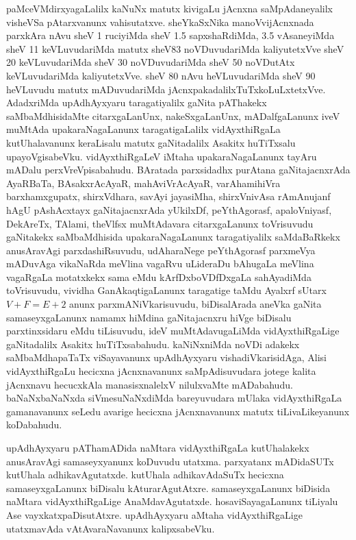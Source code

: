 paMceVMdirxyagaLalilx kaNuNx matutx kivigaLu jAcnxna saMpAdaneyalilx visheVSa pAtarxvanunx vahisutatxve. sheYkaSxNika manoVvijAcnxnada parxkAra nAvu sheV {\rm 1} ruciyiMda sheV 
{\rm 1.5} sapxshaRdiMda, {\rm 3.5} vAsaneyiMda sheV {\rm 11} keVLuvudariMda matutx sheV{\rm 83} noVDuvudariMda kaliyutetxVve sheV {\rm 20} keVLuvudariMda sheV {\rm 30} noVDuvudariMda sheV {\rm 50} noVDutAtx keVLuvudariMda kaliyutetxVve. sheV {\rm 80} nAvu heVLuvudariMda sheV {\rm 90} heVLuvudu matutx mADuvudariMda jAcnxpakadalilxTuTxkoLuLxtetxVve. AdadxriMda upAdhAyxyaru taragatiyalilx gaNita pAThakekx saMbaMdhisidaMte citarxgaLanUnx, nakeSxgaLanUnx, mADalfgaLanunx iveV muMtAda upakaraNagaLanunx taragatigaLalilx vidAyxthiRgaLa kutUhalavanunx keraLisalu matutx gaNitadalilx Asakitx huTiTxsalu upayoVgisabeVku. vidAyxthiRgaLeV iMtaha upakaraNagaLanunx tayAru mADalu perxVreVpisabahudu. BAratada parxsidadhx purAtana gaNitajacnxrAda AyaRBaTa, BAsakxrAcAyaR, mahAviVrAcAyaR, varAhamihiVra barxhamxgupatx, shirxVdhara, savAyi jayasiMha, shirxVnivAsa rAmAnujanf hAgU pAshAcxtayx gaNitajacnxrAda yUkilxDf, peYthAgorasf, apaloVniyasf, DekAreTx, TAlami, theVlfsx muMtAdavara citarxgaLanunx toVrisuvudu gaNitakekx saMbaMdhisida upakaraNagaLanunx taragatiyalilx saMdaBaRkekx anusAravAgi parxdashiRsuvudu, udAharaNege peYthAgorasf parxmeVya mADuvAga vikaNaRda meVlina vagaRvu uLideraDu bAhugaLa meVlina vagaRgaLa motatxkekx sama eMdu kArfDxboVDfDxgaLa sahAyadiMda toVrisuvudu, vividha GanAkaqtigaLanunx taragatige taMdu Ayalxrf sUtarx $V+F=E+2$ anunx parxmANiVkarisuvudu, biDisalArada aneVka gaNita samaseyxgaLanunx namamx hiMdina gaNitajacnxru hiVge biDisalu parxtinxsidaru eMdu tiLisuvudu, ideV muMtAdavugaLiMda vidAyxthiRgaLige
gaNitadalilx Asakitx huTiTxsabahudu. kaNiNxniMda noVDi adakekx saMbaMdhapaTaTx viSayavanunx upAdhAyxyaru vishadiVkarisidAga, Alisi vidAyxthiRgaLu hecicxna jAcnxnavanunx saMpAdisuvudara jotege kalita jAcnxnavu hecucxkAla manasisxnalelxV nilulxvaMte mADabahudu. baNaNxbaNaNxda siVmesuNaNxdiMda bareyuvudara mUlaka vidAyxthiRgaLa gamanavanunx seLedu avarige hecicxna jAcnxnavanunx matutx tiLivaLikeyanunx koDabahudu.

upAdhAyxyaru pAThamADida naMtara vidAyxthiRgaLa kutUhalakekx anusAravAgi samaseyxyanunx koDuvudu utatxma. parxyatanx mADidaSUTx kutUhala adhikavAgutatxde. kutUhala adhikavAdaSuTx hecicxna samaseyxgaLanunx biDisalu kAturarAgutAtxre. samaseyx\-gaLanunx biDisida naMtara vidAyxthiRgaLige AnaMdavAgutatxde. hosaviSayagaLanunx tiLiyalu Ase vayxkatxpaDisutAtxre. upAdhAyxyaru aMtaha vidAyxthiRgaLige utatxmavAda vAtAvaraNavanunx kalipxsabeVku.

